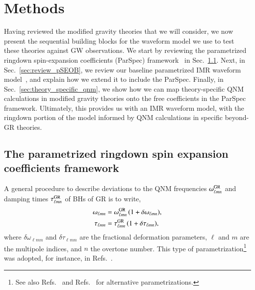 \documentclass[twocolumn,
               prd,
               aps,
               superscriptaddress,
               tightenlines,
               nofootinbib,
               eqsecnum,
               amsfonts,
               amsmath,
               longbibliography]{revtex4-1}
\begin{document}
\section{Methods}
\label{sec:method}

Having reviewed the modified gravity theories that we will consider, we now present
the sequential building blocks for the waveform model we use to test these theories
against GW observations.
%
We start by reviewing the parametrized ringdown spin-expansion coefficients
(ParSpec) framework~\cite{Maselli:2019mjd} in Sec.~\ref{sec:review_parspec}.
%
Next, in Sec.~\ref{sec:review_pSEOB}, we review our baseline
parametrized IMR waveform model~\cite{Brito:2018rfr,Ghosh:2021mrv}, and explain how we extend
it to include the ParSpec.
%
Finally, in Sec.~\ref{sec:theory_specific_qnm}, we show how we can map
theory-specific QNM calculations in modified gravity theories onto the
free coefficients in the ParSpec framework.
%
Ultimately, this provides us with an IMR waveform model, with the ringdown
portion of the model informed by QNM calculations in specific beyond-GR
theories.

\subsection{The parametrized ringdown spin expansion coefficients framework}
\label{sec:review_parspec}

A general procedure to describe deviations to the QNM frequencies $\omega^{\rm GR}_{\ell m n}$ and
damping times $\tau^{\rm GR}_{\ell m n}$ of BHs of GR is to write,
%
\begin{subequations}
\label{eq:general_deviation}
\begin{align}
\omega_{\ell m n} &= \omega_{\ell m n}^{\rm GR} \, (1 + \delta \omega_{\ell m n}), \\
\tau_{\ell m n }   &= \tau_{\ell m  n}^{\rm GR}   \, (1 + \delta \tau_{\ell m n }),
\end{align}
\end{subequations}
%
where $\delta\omega_{\ell m n}$ and $\delta\tau_{\ell m  n}$ are the fractional deformation parameters,
$\ell$ and $m$ are the multipole indices, and $n$ the overtone number.
%
This type of parametrization\footnote{See also
Refs.~\cite{Glampedakis:2017dvb,Glampedakis:2019dqh,Silva:2019scu} and
Refs.~\cite{Cardoso:2019mqo,McManus:2019ulj,Kimura:2020mrh} for alternative parametrizations.}
was adopted, for instance, in Refs.~\cite{Gossan:2011ha,Meidam:2014jpa,Brito:2018rfr,Carullo:2018sfu,Ghosh:2021mrv}.
\end{document}
